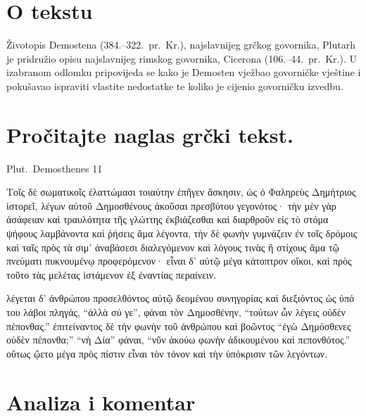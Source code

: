 


\section*{O tekstu}

Životopis Demostena (384.–322.\ pr.~Kr.), najslavnijeg grčkog govornika, Plutarh je pridružio opisu najslavnijeg rimskog govornika, Cicerona (106.–44.\ pr.~Kr.). U izabranom odlomku pripovijeda se kako je Demosten vježbao govorničke vještine i pokušavao ispraviti vlastite nedostatke te koliko je cijenio govorničku izvedbu.


\section*{Pročitajte naglas grčki tekst.}
Plut.\ Demosthenes 11

\medskip

{\large
\begin{greek}

\noindent Τοῖς δὲ σωματικοῖς ἐλαττώμασι τοιαύτην ἐπῆγεν ἄσκησιν, ὡς ὁ Φαληρεὺς Δημήτριος ἱστορεῖ, λέγων αὐτοῦ Δημοσθένους ἀκοῦσαι πρεσβύτου γεγονότος· τὴν μὲν γὰρ ἀσάφειαν καὶ τραυλότητα τῆς γλώττης ἐκβιάζεσθαι καὶ διαρθροῦν εἰς τὸ στόμα ψήφους λαμβάνοντα καὶ ῥήσεις ἅμα λέγοντα, τὴν δὲ φωνὴν γυμνάζειν ἐν τοῖς δρόμοις καὶ ταῖς πρὸς τὰ σιμ' ἀναβάσεσι διαλεγόμενον καὶ λόγους τινὰς ἢ στίχους ἅμα τῷ πνεύματι πυκνουμένῳ προφερόμενον· εἶναι δ' αὐτῷ μέγα κάτοπτρον οἴκοι, καὶ πρὸς τοῦτο τὰς μελέτας ἱστάμενον ἐξ ἐναντίας περαίνειν. 

λέγεται δ' ἀνθρώπου προσελθόντος αὐτῷ δεομένου συνηγορίας καὶ διεξιόντος ὡς ὑπό του λάβοι πληγάς, ``ἀλλὰ σύ γε'', φάναι τὸν Δημοσθένην, ``τούτων ὧν λέγεις οὐδὲν πέπονθας.'' ἐπιτείναντος δὲ τὴν φωνὴν τοῦ ἀνθρώπου καὶ βοῶντος ``ἐγὼ Δημόσθενες οὐδὲν πέπονθα;'' ``νὴ Δία'' φάναι, ``νῦν ἀκούω φωνὴν ἀδικουμένου καὶ πεπονθότος.'' οὕτως ᾤετο μέγα πρὸς πίστιν εἶναι τὸν τόνον καὶ τὴν ὑπόκρισιν τῶν λεγόντων.

\end{greek}

}

\section*{Analiza i komentar}



